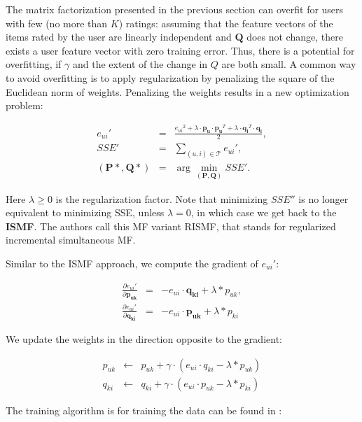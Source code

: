 \documentclass[11pt]{amsart}
\begin{document}
The matrix factorization presented in the previous section can overfit for users with few (no more than $K$) ratings: assuming that the feature vectors of the items rated by the user are linearly independent and $\mathbf{Q}$ does not change, there exists a user feature vector with zero training error. Thus, there is a potential for overfitting, if $\gamma$ and the extent of the change in $Q$ are both small. A common way to avoid overfitting is to apply regularization by penalizing the square of the Euclidean norm of weights.
Penalizing the weights results in a new optimization problem:

\begin{eqnarray}
  {e_{ui}}' &=& \frac{{e_{ui}}^2 + \lambda \cdot \mathbf{p_u} \cdot \mathbf{p_u}^T + \lambda \cdot \mathbf{q_i}^T \cdot \mathbf{q_i}}{2}, \nonumber \\
  SSE' &=& \sum_{(u, i) \in \mathcal{T}} {e_{ui}}', \nonumber \\
  (\mathbf{P*}, \mathbf{Q*}) &=& \arg\!\min_{\boldsymbol{(\mathbf{P}, \mathbf{Q})}}SSE'.
\end{eqnarray}

Here $\lambda \ge 0$ is the regularization factor. Note that minimizing $SSE''$ is no longer equivalent to minimizing SSE, unless $\lambda = 0$, in which case we get back to the \textbf{ISMF}. The authors call this MF variant RISMF, that stands for regularized incremental simultaneous MF.

Similar to the ISMF approach, we compute the gradient of ${e_{ui}}'$:

\begin{eqnarray}
  \label{eq:gradient}
  \frac{\partial{e_{ui}}'}{\partial{\mathbf{p_{uk}}}} &=& -e_{ui} \cdot \mathbf{q_{ki}} + \lambda * p_{uk}, \nonumber \\
  \frac{\partial{e_{ui}}'}{\partial{\mathbf{q_{ki}}}} &=& -e_{ui} \cdot \mathbf{p_{uk}} + \lambda * p_{ki} 
\end{eqnarray}

We update the weights in the direction opposite to the gradient:

\begin{eqnarray}
  p_{uk} &\leftarrow& p_{uk} + \gamma \cdot ( e_{ui} \cdot q_{ki} - \lambda * p_{uk} ) \\
  q_{ki} &\leftarrow& q_{ki} + \gamma \cdot ( e_{ui} \cdot p_{uk} - \lambda * p_{ki} )
\end{eqnarray}

The training algorithm is for training the data can be found in \cite{takacs09scalable}:
\end{document}
